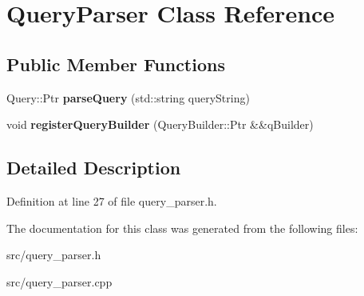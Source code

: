 \hypertarget{class_query_parser}{}\section{Query\+Parser Class Reference}
\label{class_query_parser}
\subsection*{Public Member Functions}
\begin{DoxyCompactItemize}
\item 
\mbox{\label{class_query_parser_aa0c567455e1a89ce842d869a8bd406fc}} 
Query\+::\+Ptr {\bfseries parse\+Query} (std\+::string query\+String)
\item 
\mbox{\label{class_query_parser_aae9e0cedc480e2a2b500b3d8631d0a59}} 
void {\bfseries register\+Query\+Builder} (Query\+Builder\+::\+Ptr \&\&q\+Builder)
\end{DoxyCompactItemize}


\subsection{Detailed Description}


Definition at line 27 of file query\+\_\+parser.\+h.



The documentation for this class was generated from the following files\+:\begin{DoxyCompactItemize}
\item 
src/query\+\_\+parser.\+h\item 
src/query\+\_\+parser.\+cpp\end{DoxyCompactItemize}

